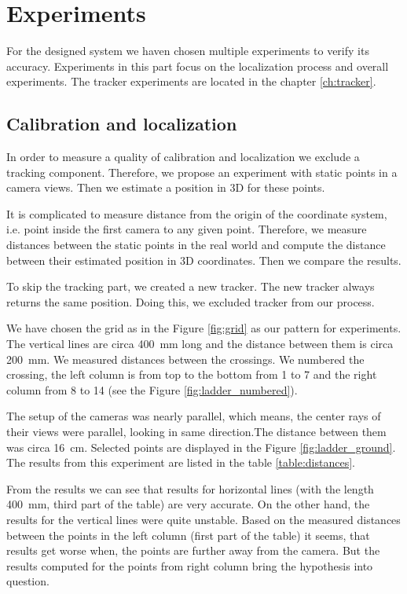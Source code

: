\chapter{Experiments} 

For the designed system we haven chosen multiple experiments to
verify its accuracy. Experiments in this part focus on the localization process
and overall experiments. The tracker experiments are located in the chapter
\ref{ch:tracker}.

\section{Calibration and localization}
\label{s:experiment-static}

In order to measure a quality of calibration and localization we exclude a
tracking component. Therefore, we propose an experiment with static points in a
camera views. Then we estimate a position in 3D for these points.

It is complicated to measure distance from the origin of the coordinate system,
i.e. point inside the first camera to any given point. Therefore, we measure
distances between the static points in the real world and compute the distance
between their estimated position in 3D coordinates. Then we compare the results.

To skip the tracking part, we created a new tracker.  The new tracker always
returns the same position.  Doing this, we excluded tracker from our process.

We have chosen the grid as in the Figure \ref{fig:grid} as our pattern for experiments.
The vertical lines are circa 400~mm long and the distance between them is circa
200~mm. We measured distances between the crossings. We numbered the crossing,
the left column is from top to the bottom from 1 to 7 and the right column from
8 to 14 (see the Figure \ref{fig:ladder_numbered}).

The setup of the cameras was nearly parallel, which means, the center rays of
their views were parallel, looking in same direction.The distance between them
was circa 16~cm. Selected points are displayed in the Figure
\ref{fig:ladder_ground}. The results from this experiment are listed in the
table \ref{table:distances}. 

From the results we can see that results for horizontal lines (with the length
400~mm, third part of the table) are very accurate. On the other hand, the
results for the vertical lines were quite unstable. Based on the measured
distances between the points in the left column (first part of the table) it
seems, that results get worse when, the points are further away from the
camera. But the results computed for the points from right column bring the
hypothesis into question. 

